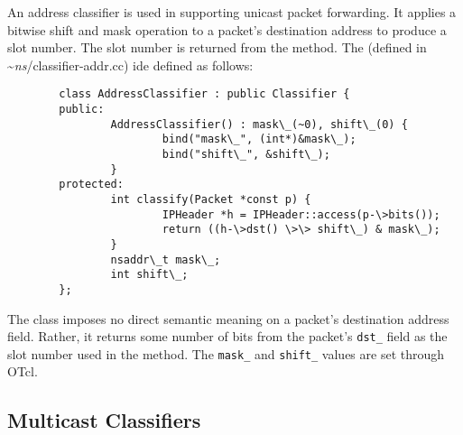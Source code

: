 An address classifier is used in supporting unicast packet forwarding.
It applies a bitwise shift and mask operation to a packet's destination
address to produce a slot number.
The slot number is returned from the  method.
The 
(defined in \textasciitilde\emph{ns}/{classifier-addr.cc}) ide defined as follows:
\begin{verbatim}
        class AddressClassifier : public Classifier {
        public:
                AddressClassifier() : mask\_(~0), shift\_(0) {
                        bind("mask\_", (int*)&mask\_);
                        bind("shift\_", &shift\_);
                }
        protected:
                int classify(Packet *const p) {
                        IPHeader *h = IPHeader::access(p-\>bits());
                        return ((h-\>dst() \>\> shift\_) & mask\_);
                }
                nsaddr\_t mask\_;
                int shift\_;
        };
\end{verbatim}
The class imposes no direct semantic meaning
on a packet's destination address field.
Rather, it returns some number of bits from the packet's
{\tt dst\_} field as the slot number used
in the  method.
The {\tt mask\_} and {\tt shift\_} values are set through OTcl.

\subsection{Multicast Classifiers}
\label{sec:node:mcast-classifier}

